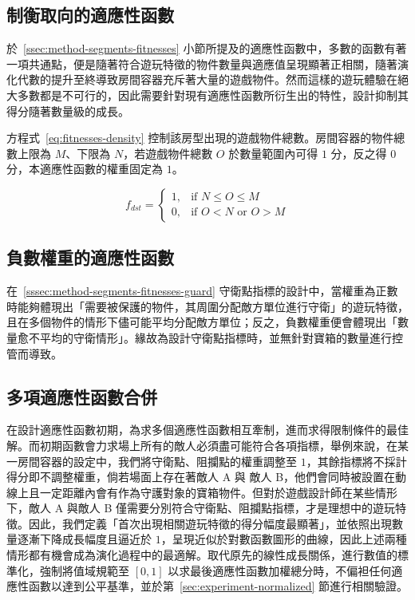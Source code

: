 \subsection{制衡取向的適應性函數}
\label{ssec:method-segments-balancefitness}

於~\ref{ssec:method-segments-fitnesses} 小節所提及的適應性函數中，多數的函數有著一項共通點，便是隨著符合遊玩特徵的物件數量與適應值呈現顯著正相關，隨著演化代數的提升至終導致房間容器充斥著大量的遊戲物件。然而這樣的遊玩體驗在絕大多數都是不可行的，因此需要針對現有適應性函數所衍生出的特性，設計抑制其得分隨著數量級的成長。

方程式~\ref{eq:fitnesses-density} 控制該房型出現的遊戲物件總數。房間容器的物件總數上限為 $M$、下限為 $N$，若遊戲物件總數 $O$ 於數量範圍內可得 $1$ 分，反之得 $0$ 分，本適應性函數的權重固定為 $1$。

\begin{equation}
    \label{eq:fitnesses-density}
    f_{dst} = \begin{cases}
                  1, & \mbox{if } N \leq O \leq M \\
                  0, & \mbox{if } O<N \text{ or } O>M
              \end{cases}
\end{equation}

\subsection{負數權重的適應性函數}
\label{ssec:method-segments-minusscores}

在~\ref{sssec:method-segments-fitnesses-guard} 守衛點指標的設計中，當權重為正數時能夠體現出「需要被保護的物件，其周圍分配敵方單位進行守衛」的遊玩特徵，且在多個物件的情形下儘可能平均分配敵方單位；反之，負數權重便會體現出「數量愈不平均的守衛情形」。緣故為設計守衛點指標時，並無針對寶箱的數量進行控管而導致。

\subsection{多項適應性函數合併}
\label{ssec:method-segments-multiobjectives}

在設計適應性函數初期，為求多個適應性函數相互牽制，進而求得限制條件的最佳解。而初期函數會力求場上所有的敵人必須盡可能符合各項指標，舉例來說，在某一房間容器的設定中，我們將守衛點、阻攔點的權重調整至 $1$，其餘指標將不採計得分即不調整權重，倘若場面上存在著敵人 A 與 敵人 B，他們會同時被設置在動線上且一定距離內會有作為守護對象的寶箱物件。但對於遊戲設計師在某些情形下，敵人 A 與敵人 B 僅需要分別符合守衛點、阻攔點指標，才是理想中的遊玩特徵。因此，我們定義「首次出現相關遊玩特徵的得分幅度最顯著」，並依照出現數量逐漸下降成長幅度且逼近於 $1$，呈現近似於對數函數圖形的曲線，因此上述兩種情形都有機會成為演化過程中的最適解。取代原先的線性成長關係，進行數值的標準化，強制將值域規範至 $[0, 1]$ 以求最後適應性函數加權總分時，不偏袒任何適應性函數以達到公平基準，並於第~\ref{sec:experiment-normalized} 節進行相關驗證。

